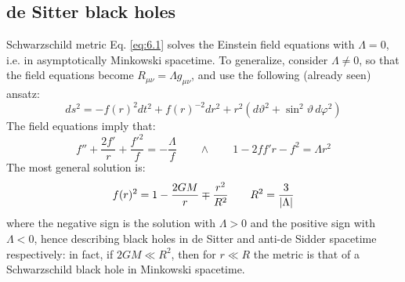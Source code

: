 \subsection{de Sitter black holes}

Schwarzschild metric Eq. \ref{eq:6.1} solves the Einstein field equations with $ \Lambda = 0 $, i.e. in asymptotically Minkowski spacetime. To generalize, consider $ \Lambda \neq 0 $, so that the field equations become $ R_{\mu \nu} = \Lambda g_{\mu \nu} $, and use the following (already seen) ansatz:
\begin{equation*}
  ds^2 = - f(r)^2 dt^2 + f(r)^{-2} dr^2 + r^2 \left( d\vartheta^2 + \sin^2 \vartheta \, d\varphi^2 \right)
\end{equation*}
The field equations imply that:
\begin{equation*}
  f'' + \frac{2f'}{r} + \frac{{f'}^2}{f} = - \frac{\Lambda}{f}
  \qquad \land \qquad
  1 - 2 f f' r - f^2 = \Lambda r^2
\end{equation*}
The most general solution is:
\begin{equation}
  f(r)^2 = 1 - \frac{2GM}{r} \mp \frac{r^2}{R^2}
  \qquad
  R^2 = \frac{3}{\left\lvert\Lambda\right\rvert}
  \label{eq:6.14}
\end{equation}
where the negative sign is the solution with $ \Lambda > 0 $ and the positive sign with $ \Lambda < 0 $, hence describing black holes in de Sitter and anti-de Sidder spacetime respectively: in fact, if $ 2GM \ll R^2 $, then for $ r \ll R $ the metric is that of a Schwarzschild black hole in Minkowski spacetime.










